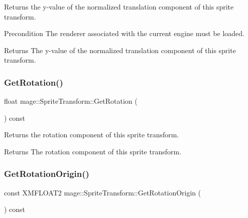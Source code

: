 Returns the y-\/value of the normalized translation component of this sprite transform.

\begin{DoxyPrecond}{Precondition}
The renderer associated with the current engine must be loaded. 
\end{DoxyPrecond}
\begin{DoxyReturn}{Returns}
The y-\/value of the normalized translation component of this sprite transform. 
\end{DoxyReturn}
\hypertarget{structmage_1_1_sprite_transform_a2a89a583752a20fc61e8e13461781b44}{}\label{structmage_1_1_sprite_transform_a2a89a583752a20fc61e8e13461781b44} 
\subsubsection{\texorpdfstring{Get\+Rotation()}{GetRotation()}}
{\footnotesize\ttfamily float mage\+::\+Sprite\+Transform\+::\+Get\+Rotation (\begin{DoxyParamCaption}{ }\end{DoxyParamCaption}) const\hspace{0.3cm}{\ttfamily [noexcept]}}

Returns the rotation component of this sprite transform.

\begin{DoxyReturn}{Returns}
The rotation component of this sprite transform. 
\end{DoxyReturn}
\hypertarget{structmage_1_1_sprite_transform_aa7a6f3cad38ed9231455de722e60040c}{}\label{structmage_1_1_sprite_transform_aa7a6f3cad38ed9231455de722e60040c} 
\subsubsection{\texorpdfstring{Get\+Rotation\+Origin()}{GetRotationOrigin()}}
{\footnotesize\ttfamily const X\+M\+F\+L\+O\+A\+T2 mage\+::\+Sprite\+Transform\+::\+Get\+Rotation\+Origin (\begin{DoxyParamCaption}{ }\end{DoxyParamCaption}) const\hspace{0.3cm}{\ttfamily [noexcept]}}

